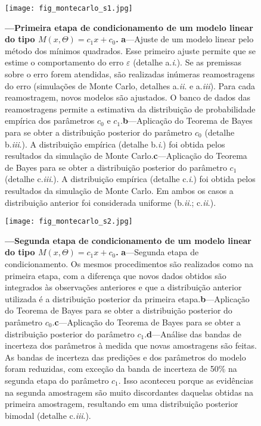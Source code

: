 \documentclass[./main.tex]{subfiles}
\begin{document}
\begin{figure}[t!] %
	\centering				
	\texttt{[image: fig\_montecarlo\_s1.jpg]}		
	\caption[Primeira etapa de condicionamento de um modelo linear]
	{\textbf{---\;Primeira etapa de condicionamento de um modelo linear do tipo $M(x, \Theta) = c_{1}x + c_{0}$.}
        \;\textbf{a}\;---\;Ajuste de um modelo linear pelo método dos mínimos quadrados. Esse primeiro ajuste permite que se estime o comportamento do erro $\varepsilon$ (detalhe a.\textit{\textrm{i}}.). Se as premissas sobre o erro forem atendidas, são realizadas inúmeras reamostragens do erro (simulações de Monte Carlo, detalhes a.\textit{\textrm{ii}}. e a.\textit{\textrm{iii}}). Para cada reamostragem, novos modelos são ajustados. O banco de dados das reamostragens permite a estimativa da distribuição de probabilidade empírica dos parâmetros $c_0$ e $c_1$.\;\textbf{b}\;---\;Aplicação do Teorema de Bayes para se obter a distribuição posterior do parâmetro $c_0$ (detalhe b.\textit{\textrm{iii}}.). A distribuição empírica (detalhe b.\textit{\textrm{i}}.) foi obtida pelos resultados da simulação de Monte Carlo.\;\textbf{c}\;---\;Aplicação do Teorema de Bayes para se obter a distribuição posterior do parâmetro $c_1$ (detalhe c.\textit{\textrm{iii}}.). A distribuição empírica (detalhe c.\textit{\textrm{i}}.) foi obtida pelos resultados da simulação de Monte Carlo. Em ambos os casos a distribuição anterior foi considerada uniforme (b.\textit{\textrm{ii}}.; c.\textit{\textrm{ii}}.).
	}
\label{fig:bayes_s1}  %
\end{figure}
\begin{figure}[t!] %
	\centering				
	\texttt{[image: fig\_montecarlo\_s2.jpg]}		
	\caption[Segunda etapa de condicionamento de um modelo linear]
	{\textbf{---\;Segunda etapa de condicionamento de um modelo linear do tipo $M(x, \Theta) = c_{1}x + c_{0}$.}
        \;\textbf{a}\;---\;Segunda etapa de condicionamento. Os mesmos procedimentos são realizados como na primeira etapa, com a diferença que novos dados obtidos são integrados às observações anteriores e que a distribuição anterior utilizada é a distribuição posterior da primeira etapa.\;\textbf{b}\;---\;Aplicação do Teorema de Bayes para se obter a distribuição posterior do parâmetro $c_0$.\;\textbf{c}\;---\;Aplicação do Teorema de Bayes para se obter a distribuição posterior do parâmetro $c_1$.\;\textbf{d}\;---\;Análise das bandas de incerteza dos parâmetros à medida que novas amostragens são feitas. As bandas de incerteza das predições e dos parâmetros do modelo foram reduzidas, com exceção da banda de incerteza de 50\% na segunda etapa do parâmetro $c_1$. Isso aconteceu porque as evidências na segunda amostragem são muito discordantes daquelas obtidas na primeira amostragem, resultando em uma distribuição posterior bimodal (detalhe c.\textit{\textrm{iii}}.).
	}
\label{fig:bayes_s2}  %
\end{figure}
\end{document}
